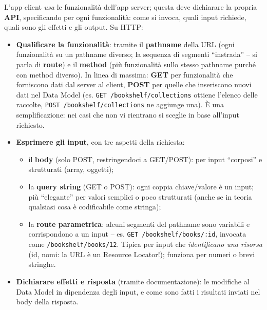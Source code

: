 L'app client \emph{usa} le funzionalit\`a dell'app server; questa deve dichiarare la propria
\textbf{API}, specificando per ogni funzionalit\`a: come si invoca, quali input richiede,
quali sono gli effetti e gli output. Su HTTP:
\begin{itemize}
  \item \textbf{Qualificare la funzionalit\`a}: tramite il \textbf{pathname} della URL (ogni
        funzionalit\`a su un pathname diverso; la sequenza di segmenti ``instrada'' -- si
        parla di \textbf{route}) e il \textbf{method} (pi\`u funzionalit\`a sullo stesso
        pathname purch\'e con method diverso). In linea di massima: \textbf{GET} per
        funzionalit\`a che forniscono dati dal server al client, \textbf{POST} per quelle che
        inseriscono nuovi dati nel Data Model (es. \texttt{GET /bookshelf/collections}
        ottiene l'elenco delle raccolte, \texttt{POST /bookshelf/collections} ne aggiunge
        una). \`E una semplificazione: nei casi che non vi rientrano si sceglie in base
        all'input richiesto.
  \item \textbf{Esprimere gli input}, con tre aspetti della richiesta:
        \begin{itemize}
          \item il \textbf{body} (solo POST, restringendoci a GET/POST): per input
                ``corposi'' e strutturati (array, oggetti);
          \item la \textbf{query string} (GET o POST): ogni coppia chiave/valore \`e un
                input; pi\`u ``elegante'' per valori semplici o poco strutturati (anche se in
                teoria qualsiasi cosa \`e codificabile come stringa);
          \item la \textbf{route parametrica}: alcuni segmenti del pathname sono variabili e
                corrispondono a un input -- es. \texttt{GET /bookshelf/books/:id}, invocata
                come \texttt{/bookshelf/books/12}. Tipica per input che \emph{identificano
                una risorsa} (id, nomi: la URL \`e un Resource Locator!); funziona per numeri
                o brevi stringhe.
        \end{itemize}
  \item \textbf{Dichiarare effetti e risposta} (tramite documentazione): le modifiche al Data
        Model in dipendenza degli input, e come sono fatti i risultati inviati nel body della
        risposta.
\end{itemize}
